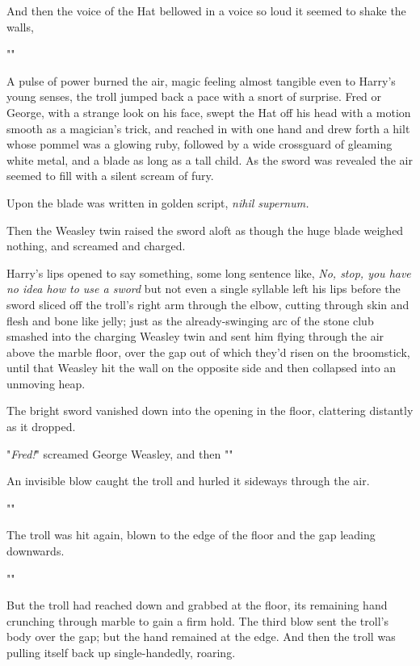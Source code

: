 And then the voice of the Hat bellowed in a voice so loud it seemed to shake
the walls,

"\emph{}"

A pulse of power burned the air, magic feeling almost tangible even to Harry's
young senses, the troll jumped back a pace with a snort of surprise. Fred or
George, with a strange look on his face, swept the Hat off his head with a
motion smooth as a magician's trick, and reached in with one hand and drew
forth a hilt whose pommel was a glowing ruby, followed by a wide crossguard of
gleaming white metal, and a blade as long as a tall child. As the sword was
revealed the air seemed to fill with a silent scream of fury.

Upon the blade was written in golden script, \emph{nihil supernum.}

Then the Weasley twin raised the sword aloft as though the huge blade weighed
nothing, and screamed and charged.

Harry's lips opened to say something, some long sentence like, \emph{No, stop,
you have no idea how to use a sword} but not even a single syllable left his
lips before the sword sliced off the troll's right arm through the elbow,
cutting through skin and flesh and bone like jelly; just as the
already-swinging arc of the stone club smashed into the charging Weasley twin
and sent him flying through the air above the marble floor, over the gap out of
which they'd risen on the broomstick, until that Weasley hit the wall on the
opposite side and then collapsed into an unmoving heap.

The bright sword vanished down into the opening in the floor, clattering
distantly as it dropped.

"\emph{Fred!}" screamed George Weasley, and then "\emph{}"

An invisible blow caught the troll and hurled it sideways through the air.

"\emph{}"

The troll was hit again, blown to the edge of the floor and the gap leading
downwards.

"\emph{}"

But the troll had reached down and grabbed at the floor, its remaining hand
crunching through marble to gain a firm hold. The third blow sent the troll's
body over the gap; but the hand remained at the edge. And then the troll was
pulling itself back up single-handedly, roaring.

